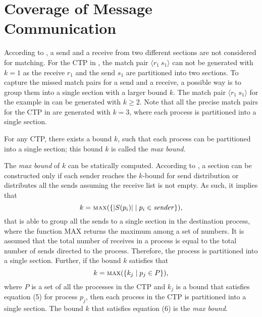 \section{Coverage of Message Communication}

According to , a send and a receive from two different sections are not considered for matching. For the CTP in , the match pair $\langle r_1\ s_1\rangle$ can not be generated with $k=1$ as the receive $r_1$ and the send $s_1$ are partitioned into two sections. 
To capture the missed match pairs for a send and a receive, a possible way is to group them into a single section with a larger bound $k$.  The match pair $\langle r_1\ s_1\rangle$ for the example in  can be generated with $k\geq2$.  
Note that all the precise match pairs for the CTP in  are generated with $k=3$, where each process is partitioned into a single section.
 
\begin{definition}
\label{def:maxbound}
For any CTP, there exists a bound $k$, such that each process can be partitioned into a single section; this bound $k$ is called the \textit{max bound}. 
\end{definition} 

The \textit{max bound} of $k$ can be statically computed. 
According to , a section can be constructed only if each sender reaches the $k$-bound for send distribution or distributes all the sends assuming the receive list is not empty. As such, it implies that 
\begin{equation}
k= \Call{max}{\{|S(p_i)|\mid p_i \in \mathit{sender}\}},
\end{equation}
that is able to group all the sends to a single section in the destination process, where the function $\mathrm{MAX}$ returns the maximum among a set of numbers. It is assumed that the total number of receives in a process is equal to the total number of sends directed to the process. Therefore, the process is partitioned into a single section. Further, if the bound $k$ satisfies that  
\begin{equation}
k= \Call{max}{\{k_j \mid p_j\in P\}},
\end{equation} 
where $P$ is a set of all the processes in the CTP and $k_j$ is a bound that satisfies equation (5) for process $p_j$, then each process in the CTP is partitioned into a single section. The bound $k$ that satisfies equation (6) is the \textit{max bound}. 

